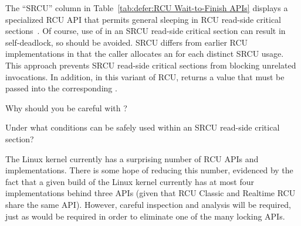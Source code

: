 The ``SRCU'' column in
Table~\ref{tab:defer:RCU Wait-to-Finish APIs}
displays a specialized RCU API that permits
general sleeping in RCU read-side critical
sections~\cite{PaulEMcKenney2006c}.
Of course,
use of  in an SRCU read-side
critical section can result in
self-deadlock, so should be avoided.
SRCU differs from earlier RCU implementations in that the caller
allocates an  for each distinct SRCU
usage.
This approach prevents SRCU read-side critical sections from blocking
unrelated  invocations.
In addition, in this variant of RCU, 
returns a value that must be passed into the corresponding
.

\QuickQuiz{}
	Why should you be careful with ?
 \QuickQuizEnd

\QuickQuiz{}
	Under what conditions can  be safely
	used within an SRCU read-side critical section?
 \QuickQuizEnd

The Linux kernel currently has a surprising number of RCU APIs and
implementations.
There is some hope of reducing this number, evidenced by the fact
that a given build of the Linux kernel currently has at most
four implementations behind three APIs (given that RCU Classic
and Realtime RCU share the same API).
However, careful inspection and analysis will be required, just as
would be required in order to eliminate one of the many locking APIs.

